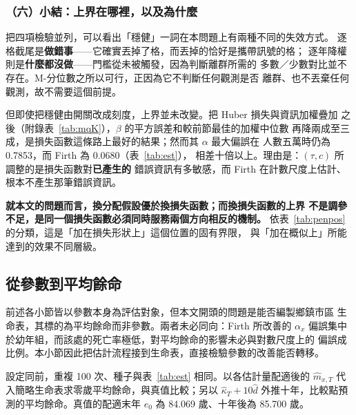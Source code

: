 \documentclass[UTF8, fontset=macnew, a4paper, 12pt]{ctexart}
\begin{document}
\subsubsection{（六）小結：上界在哪裡，以及為什麼}

把四項檢驗並列，可以看出「穩健」一詞在本問題上有兩種不同的失效方式。
逐格截尾是\textbf{做錯事}——它確實丟掉了格，而丟掉的恰好是攜帶訊號的格；
逐年降權則是\textbf{什麼都沒做}——門檻從未被觸發，因為判斷離群所需的
多數／少數對比並不存在。M-分位數之所以可行，正因為它不判斷任何觀測是否
離群、也不丟棄任何觀測，故不需要這個前提。

但即使把穩健由開關改成刻度，上界並未改變。把 Huber 損失與資訊加權疊加
之後（附錄表~\ref{tab:mqK}），$\beta$ 的平方誤差和較前節最佳的加權中位數
再降兩成至三成，是損失函數這條路上最好的結果；然而其 $\alpha$ 最大偏誤在
人數五萬時仍為 0.7853，而 Firth 為 0.0680（表~\ref{tab:est}），
相差十倍以上。理由是：$(\tau,c)$ 所調整的是損失函數對\textbf{已產生的}
錯誤資訊有多敏感，而 Firth 在計數尺度上估計、根本不產生那筆錯誤資訊。

\textbf{就本文的問題而言，換分配假設優於換損失函數；而換損失函數的上界
不是調參不足，是同一個損失函數必須同時服務兩個方向相反的機制。}
依表~\ref{tab:penpos} 的分類，這是「加在損失形狀上」這個位置的固有界限，
與「加在概似上」所能達到的效果不同層級。

\subsection{從參數到平均餘命}\label{sec:e0}

前述各小節皆以參數本身為評估對象，但本文開頭的問題是能否編製鄉鎮市區
生命表，其標的為平均餘命而非參數。兩者未必同向：Firth 所改善的 $\alpha_x$
偏誤集中於幼年組，而該處的死亡率極低，對平均餘命的影響未必與對數尺度上的
偏誤成比例。本小節因此把估計流程接到生命表，直接檢驗參數的改善能否轉移。

設定同前，重複 100 次、種子與表~\ref{tab:est} 相同。以各估計量配適後的
$\hat m_{x,T}$ 代入簡略生命表求零歲平均餘命，與真值比較；另以
$\hat\kappa_T+10\hat d$ 外推十年，比較點預測的平均餘命。真值的配適末年
$e_0$ 為 84.069 歲、十年後為 85.700 歲。
\end{document}
